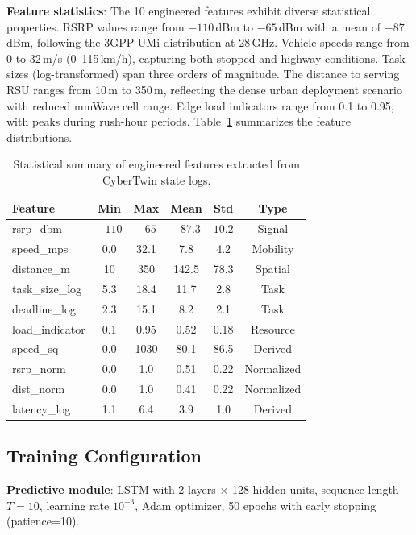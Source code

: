 \documentclass[10pt,letterpaper]{article}
\begin{document}
\textbf{Feature statistics}: The 10 engineered features exhibit diverse statistical properties. RSRP values range from $-110$\,dBm to $-65$\,dBm with a mean of $-87$\,dBm, following the 3GPP UMi distribution at 28\,GHz. Vehicle speeds range from 0 to 32\,m/s (0--115\,km/h), capturing both stopped and highway conditions. Task sizes (log-transformed) span three orders of magnitude. The distance to serving RSU ranges from 10\,m to 350\,m, reflecting the dense urban deployment scenario with reduced mmWave cell range. Edge load indicators range from 0.1 to 0.95, with peaks during rush-hour periods. Table~\ref{tab:feature_stats} summarizes the feature distributions.

\begin{table}[t]
\centering
\caption{Statistical summary of engineered features extracted from CyberTwin state logs.}
\label{tab:feature_stats}
\small
\begin{tabular}{lccccc}
\toprule
\textbf{Feature} & \textbf{Min} & \textbf{Max} & \textbf{Mean} & \textbf{Std} & \textbf{Type} \\
\midrule
rsrp\_dbm & $-110$ & $-65$ & $-87.3$ & $10.2$ & Signal \\
speed\_mps & 0.0 & 32.1 & 7.8 & 4.2 & Mobility \\
distance\_m & 10 & 350 & 142.5 & 78.3 & Spatial \\
task\_size\_log & 5.3 & 18.4 & 11.7 & 2.8 & Task \\
deadline\_log & 2.3 & 15.1 & 8.2 & 2.1 & Task \\
load\_indicator & 0.1 & 0.95 & 0.52 & 0.18 & Resource \\
speed\_sq & 0.0 & 1030 & 80.1 & 86.5 & Derived \\
rsrp\_norm & 0.0 & 1.0 & 0.51 & 0.22 & Normalized \\
dist\_norm & 0.0 & 1.0 & 0.41 & 0.22 & Normalized \\
latency\_log & 1.1 & 6.4 & 3.9 & 1.0 & Derived \\
\bottomrule
\end{tabular}
\end{table}

\subsection*{Training Configuration}

\textbf{Predictive module}: LSTM with 2 layers $\times$ 128 hidden units, sequence length $T=10$, learning rate $10^{-3}$, Adam optimizer, 50 epochs with early stopping (patience=10).
\end{document}
